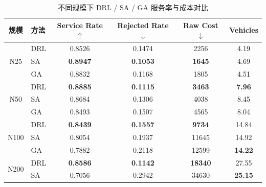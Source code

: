 \begin{table}[htbp]
\centering
\caption{不同规模下 DRL / SA / GA 服务率与成本对比}
\label{tab:comparison-all}
\begin{tabular}{clcccc}
\toprule
规模 & 方法 & Service Rate$\uparrow$ & Rejected Rate$\downarrow$ & Raw Cost$\downarrow$ & Vehicles \\
\midrule
\multirow{3}{*}{N25}
  & DRL & 0.8526          & 0.1474          & 2256            & 4.19 \\
  & SA  & \textbf{0.8947} & \textbf{0.1053} & \textbf{1645}   & 4.69 \\
  & GA  & 0.8832          & 0.1168          & 1805            & 4.51 \\
\midrule
\multirow{3}{*}{N50}
  & DRL & \textbf{0.8885} & \textbf{0.1115} & \textbf{3463}   & \textbf{7.96} \\
  & SA  & 0.8684          & 0.1306          & 4038            & 8.45 \\
  & GA  & 0.8493          & 0.1507          & 4565            & 8.04 \\
\midrule
\multirow{3}{*}{N100}
  & DRL & \textbf{0.8439} & \textbf{0.1557} & \textbf{9734}   & 14.84 \\
  & SA  & 0.8054          & 0.1937          & 11645           & 14.92 \\
  & GA  & 0.7882          & 0.2118          & 12599           & \textbf{14.22} \\
\midrule
\multirow{2}{*}{N200}
  & DRL & \textbf{0.8586} & \textbf{0.1142} & \textbf{18340}  & 27.55 \\
  & SA  & 0.7056          & 0.2942          & 34630           & \textbf{25.15} \\
\bottomrule
\end{tabular}
\end{table}
